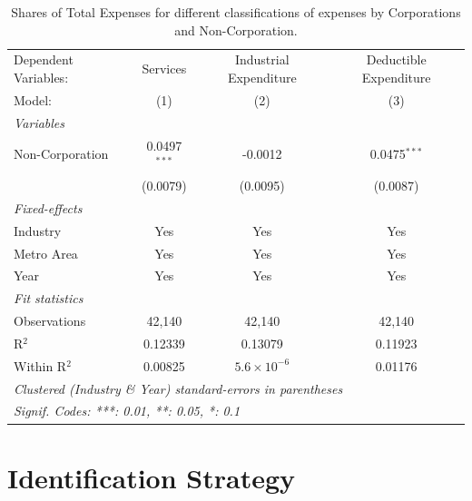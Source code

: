 \documentclass[
  12pt]{article}
\theoremstyle{definition}
\theoremstyle{remark}
\begin{document}
\begin{table}

\caption{\label{tbl-reg-shares-3}Shares of Total Expenses for different
classifications of expenses by Corporations and Non-Corporation.}

\begin{minipage}{\linewidth}

\begingroup
\centering
\begin{tabular}{lccc}
   \tabularnewline \midrule \midrule
   Dependent Variables: & Services       & Industrial Expenditure & Deductible Expenditure\\  
   Model:               & (1)            & (2)                    & (3)\\  
   \midrule
   \emph{Variables}\\
   Non-Corporation      & 0.0497$^{***}$ & -0.0012                & 0.0475$^{***}$\\   
                        & (0.0079)       & (0.0095)               & (0.0087)\\   
   \midrule
   \emph{Fixed-effects}\\
   Industry             & Yes            & Yes                    & Yes\\  
   Metro Area           & Yes            & Yes                    & Yes\\  
   Year                 & Yes            & Yes                    & Yes\\  
   \midrule
   \emph{Fit statistics}\\
   Observations         & 42,140         & 42,140                 & 42,140\\  
   R$^2$                & 0.12339        & 0.13079                & 0.11923\\  
   Within R$^2$         & 0.00825        & $5.6\times 10^{-6}$    & 0.01176\\  
   \midrule \midrule
   \multicolumn{4}{l}{\emph{Clustered (Industry \& Year) standard-errors in parentheses}}\\
   \multicolumn{4}{l}{\emph{Signif. Codes: ***: 0.01, **: 0.05, *: 0.1}}\\
\end{tabular}
\par\endgroup

\end{minipage}%

\end{table}%

\section{Identification Strategy}\label{identification-strategy}
\end{document}
